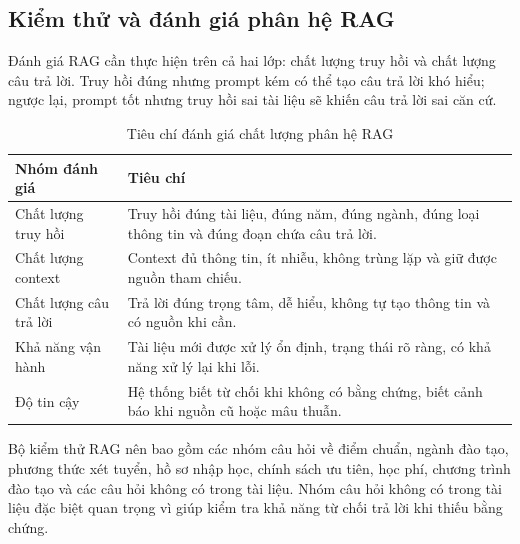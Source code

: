 \subsection{Kiểm thử và đánh giá phân hệ RAG}

Đánh giá RAG cần thực hiện trên cả hai lớp: chất lượng truy hồi và chất lượng câu trả lời. Truy hồi đúng nhưng prompt kém có thể tạo câu trả lời khó hiểu; ngược lại, prompt tốt nhưng truy hồi sai tài liệu sẽ khiến câu trả lời sai căn cứ.

\begin{table}[H]
\centering
\begin{tabular}{|p{4cm}|p{8.8cm}|}
\hline
\textbf{Nhóm đánh giá} & \textbf{Tiêu chí} \\
\hline
Chất lượng truy hồi & Truy hồi đúng tài liệu, đúng năm, đúng ngành, đúng loại thông tin và đúng đoạn chứa câu trả lời. \\
\hline
Chất lượng context & Context đủ thông tin, ít nhiễu, không trùng lặp và giữ được nguồn tham chiếu. \\
\hline
Chất lượng câu trả lời & Trả lời đúng trọng tâm, dễ hiểu, không tự tạo thông tin và có nguồn khi cần. \\
\hline
Khả năng vận hành & Tài liệu mới được xử lý ổn định, trạng thái rõ ràng, có khả năng xử lý lại khi lỗi. \\
\hline
Độ tin cậy & Hệ thống biết từ chối khi không có bằng chứng, biết cảnh báo khi nguồn cũ hoặc mâu thuẫn. \\
\hline
\end{tabular}
\caption{Tiêu chí đánh giá chất lượng phân hệ RAG}
\label{tab:rag-evaluation-criteria}
\end{table}

Bộ kiểm thử RAG nên bao gồm các nhóm câu hỏi về điểm chuẩn, ngành đào tạo, phương thức xét tuyển, hồ sơ nhập học, chính sách ưu tiên, học phí, chương trình đào tạo và các câu hỏi không có trong tài liệu. Nhóm câu hỏi không có trong tài liệu đặc biệt quan trọng vì giúp kiểm tra khả năng từ chối trả lời khi thiếu bằng chứng.
